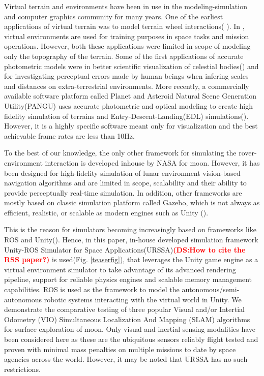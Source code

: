 \documentclass[a4paper, 10pt, conference]{ieeeconf}      %
\newcommand\coltxt[2]{\textbf{\textcolor{#1}{(#2)}}}
\newcommand\ds[1]{\coltxt{red}{DS:#1}}
\begin{document}
Virtual terrain and environments have been in use in the modeling-simulation and computer graphics community for many years. One of the earliest applications of virtual terrain was to model terrain wheel interactions( \cite{yang2007realistic,yang2008virtual,ding2008design,gao2012virtual}). In \cite{andreev2018creating}, virtual environments are used for training purposes in space tasks and mission operations. However, both these applications were limited in scope of modeling only the topography of the terrain. Some of the first applications of accurate photometric models were in better scientific visualization of celestial bodies(\cite{van2011investigation,wright2011preparing, jensen2001physically}) and for investigating perceptual errors made by human beings  when infering scales and distances on extra-terrestrial environments\cite{oravetz2011slope}. More recently, a commercially available software platform called Planet and Asteroid Natural Scene Generation Utility(PANGU) uses accurate photometric and optical modeling  to create high fidelity simulation of terrains and Entry-Descent-Landing(EDL) simulations(\cite{dunstan2018pangu,martin2019planetary}). However, it is a highly specific software meant only for visualization and the best achievable frame rates are less than 10Hz. 

To the best of our knowledge, the only other framework for simulating the rover-environment interaction is developed inhouse by NASA\cite{allan2019planetary} for moon. However, it has been designed for high-fidelity simulation of lunar environment vision-based navigation algorithms and are limited in scope, scalability and their ability to provide perceptually real-time simulation. In addition, other frameworks are mostly based on classic simulation platform called Gazebo\cite{koenig2004design}, which is not always as efficient, realistic, or scalable as modern engines such as Unity (\cite{engine2008unity, konrad2019simulation}). 

This is the reason for simulators becoming increasingly based on frameworks like ROS\cite{quigley2009ros} and Unity(\cite{babaians2018ros2unity3d,bischoffm_2019_06}). Hence, in this paper, in-house developed simulation framework Unity-ROS Simulator for Space Applications(URSSA)\cite{msm2020rss}\ds{How to cite the RSS paper?} is used(Fig. \ref{teaserfig}), that leverages the Unity game engine as a virtual environment simulator to take advantage of its advanced rendering pipeline, support for reliable physics engines and scalable memory management capabilities. ROS is used as the framework to model the autonomous/semi-autonomous robotic systems interacting with the virtual world in Unity. We demonstrate the comparative testing of three popular Visual and/or Intertial Odometry (VIO)\cite{roumeliotis2002augmenting} Simultaneous Localization And Mapping (SLAM)\cite{durrant1996localization} algorithms for surface exploration of moon. Only visual and inertial sensing modalities have been considered here as these are the ubiquitous sensors reliably flight tested and proven with minimal mass penalties on multiple missions to date by space agencies across the world. However, it may be noted that URSSA has no such restrictions.
\end{document}
